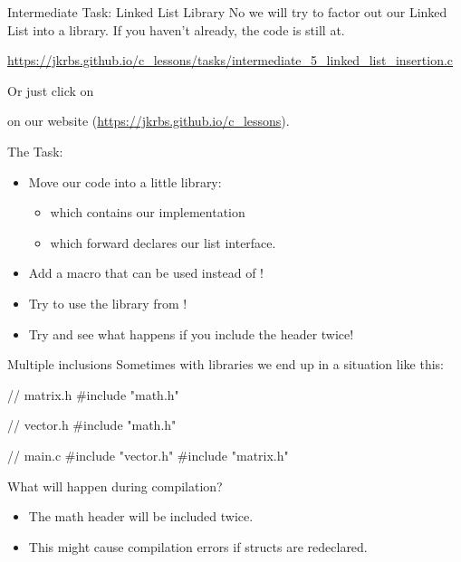 \documentclass[10pt,graphics,aspectratio=169,table]{beamer}
\begin{document}
\begin{frame}[fragile]{Intermediate Task: Linked List Library}
    No we will try to factor out our Linked List into a library.
    If you haven't already, the code is still at.

    \small
    \url{https://jkrbs.github.io/c_lessons/tasks/intermediate_5_linked_list_insertion.c}
    
    Or just click on 
   
    on our website (\url{https://jkrbs.github.io/c_lessons}).

    The Task:

    \begin{itemize}
        \item Move our code into a little library: 
        \begin{itemize}
            \item {} which contains our implementation
            \item {} which forward declares our list interface.
        \end{itemize}
        \item Add a  macro that can be used instead of !
        \item Try to use the library from !
        \item Try and see what happens if you include the  header twice!
    \end{itemize}
    
\end{frame}

\begin{frame}[fragile]{Multiple inclusions}
    Sometimes with libraries we end up in a situation like this:
    \begin{codeblock}
// matrix.h
#include "math.h"

// vector.h
#include "math.h"

// main.c
#include "vector.h"
#include "matrix.h"
    \end{codeblock}

    What will happen during compilation?
    \pause
    \begin{itemize}
        \item The math header will be included twice.
       
        \item This might cause compilation errors if structs are redeclared.
    \end{itemize}
\end{frame}
\end{document}
